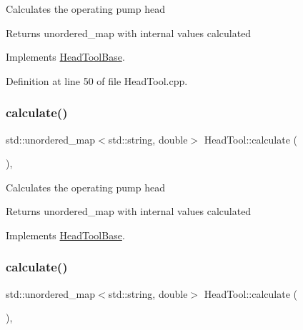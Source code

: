 Calculates the operating pump head \begin{DoxyReturn}{Returns}
unordered\+\_\+map with internal values calculated 
\end{DoxyReturn}


Implements \hyperlink{class_head_tool_base_ab8df8f908827ce45dc5e769ea0e10f0b}{Head\+Tool\+Base}.



Definition at line 50 of file Head\+Tool.\+cpp.

\mbox{\label{class_head_tool_a146eaf45d39cf6d691fa10b4b80b5e9e}} 
\subsubsection{\texorpdfstring{calculate()}{calculate()}\hspace{0.1cm}{\footnotesize\ttfamily [2/3]}}
{\footnotesize\ttfamily std\+::unordered\+\_\+map$<$std\+::string, double$>$ Head\+Tool\+::calculate (\begin{DoxyParamCaption}{ }\end{DoxyParamCaption})\hspace{0.3cm}{\ttfamily [override]}, {\ttfamily [virtual]}}

Calculates the operating pump head \begin{DoxyReturn}{Returns}
unordered\+\_\+map with internal values calculated 
\end{DoxyReturn}


Implements \hyperlink{class_head_tool_base_ab8df8f908827ce45dc5e769ea0e10f0b}{Head\+Tool\+Base}.

\mbox{\label{class_head_tool_a146eaf45d39cf6d691fa10b4b80b5e9e}} 
\subsubsection{\texorpdfstring{calculate()}{calculate()}\hspace{0.1cm}{\footnotesize\ttfamily [3/3]}}
{\footnotesize\ttfamily std\+::unordered\+\_\+map$<$std\+::string, double$>$ Head\+Tool\+::calculate (\begin{DoxyParamCaption}{ }\end{DoxyParamCaption})\hspace{0.3cm}{\ttfamily [override]}, {\ttfamily [virtual]}}

